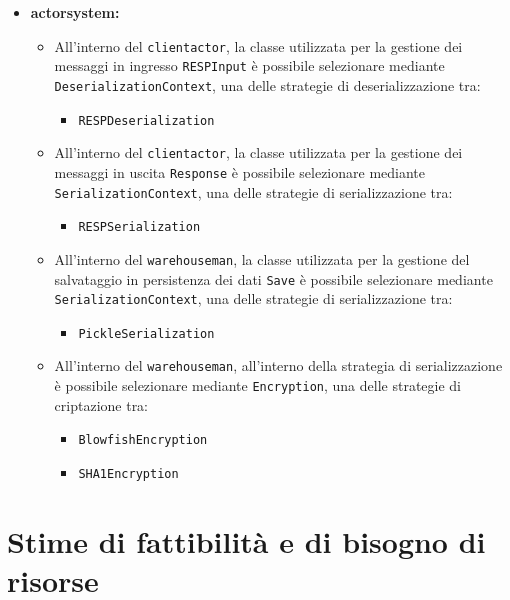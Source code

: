 \documentclass{scalatekids-article}
\begin{document}
\begin{itemize}
\begin{itemize}
  \item \textbf{actorsystem:}
    \begin{itemize}
    \item All'interno del  \verb=clientactor=, la classe utilizzata per la
      gestione dei messaggi in ingresso \verb=RESPInput= è possibile selezionare
      mediante \verb=DeserializationContext=, una delle strategie di deserializzazione
      tra:
      \begin{itemize}
      \item \verb=RESPDeserialization=
      \end{itemize}
    \item All'interno del  \verb=clientactor=, la classe utilizzata per la
      gestione dei messaggi in uscita \verb=Response= è possibile selezionare
      mediante \verb=SerializationContext=, una delle strategie di serializzazione
      tra:
      \begin{itemize}
      \item \verb=RESPSerialization=
      \end{itemize}
    \item All'interno del  \verb=warehouseman=, la classe utilizzata per
      la gestione del salvataggio in persistenza dei dati \verb=Save= è
      possibile selezionare mediante \verb=SerializationContext=, una delle
      strategie di serializzazione tra:
      \begin{itemize}
      \item \verb=PickleSerialization=
      \end{itemize}
    \item All'interno del  \verb=warehouseman=, all'interno della
      strategia di serializzazione è possibile selezionare mediante
      \verb=Encryption=, una delle strategie di criptazione tra:
      \begin{itemize}
      \item \verb=BlowfishEncryption=
      \item \verb=SHA1Encryption=
      \end{itemize}
    \end{itemize}

  \end{itemize}

\end{itemize}

\section{Stime di fattibilità e di bisogno di risorse}
\end{document}
